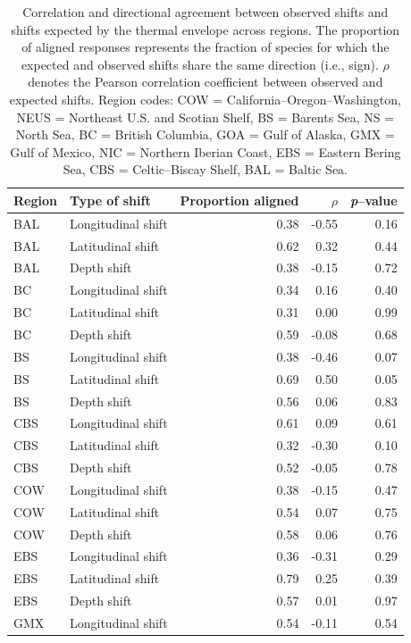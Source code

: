 \documentclass[11pt]{article}
\begin{document}
\begin{table}[ht]
\caption{Correlation and directional agreement between observed shifts and shifts expected by the thermal envelope across regions. 
The proportion of aligned responses represents the fraction of species for which the expected and observed shifts share the same direction (i.e., sign). 
$\rho$ denotes the Pearson correlation coefficient between observed and expected shifts. 
Region codes: COW = California–Oregon–Washington, NEUS = Northeast U.S. and Scotian Shelf, BS = Barents Sea, NS = North Sea, BC = British Columbia, GOA = Gulf of Alaska, GMX = Gulf of Mexico, NIC = Northern Iberian Coast, EBS = Eastern Bering Sea, CBS = Celtic–Biscay Shelf, BAL = Baltic Sea.}
\centering
\label{tab:thermal_envelope_regions}
\begin{tabular}{l l r r r}
\hline
Region & Type of shift & Proportion aligned & $\rho$ & \textit{p}--value \\
\hline
BAL & Longitudinal shift & 0.38 & -0.55 & 0.16 \\
BAL & Latitudinal shift  & 0.62 & 0.32  & 0.44 \\
BAL & Depth shift        & 0.38 & -0.15 & 0.72 \\
BC  & Longitudinal shift & 0.34 & 0.16  & 0.40 \\
BC  & Latitudinal shift  & 0.31 & 0.00  & 0.99 \\
BC  & Depth shift        & 0.59 & -0.08 & 0.68 \\
BS  & Longitudinal shift & 0.38 & -0.46 & 0.07 \\
BS  & Latitudinal shift  & 0.69 & 0.50  & 0.05 \\
BS  & Depth shift        & 0.56 & 0.06  & 0.83 \\
CBS & Longitudinal shift & 0.61 & 0.09  & 0.61 \\
CBS & Latitudinal shift  & 0.32 & -0.30 & 0.10 \\
CBS & Depth shift        & 0.52 & -0.05 & 0.78 \\
COW & Longitudinal shift & 0.38 & -0.15 & 0.47 \\
COW & Latitudinal shift  & 0.54 & 0.07  & 0.75 \\
COW & Depth shift        & 0.58 & 0.06  & 0.76 \\
EBS & Longitudinal shift & 0.36 & -0.31 & 0.29 \\
EBS & Latitudinal shift  & 0.79 & 0.25  & 0.39 \\
EBS & Depth shift        & 0.57 & 0.01  & 0.97 \\
GMX & Longitudinal shift & 0.54 & -0.11 & 0.54 \\

\end{tabular}
\end{table}
\end{document}

